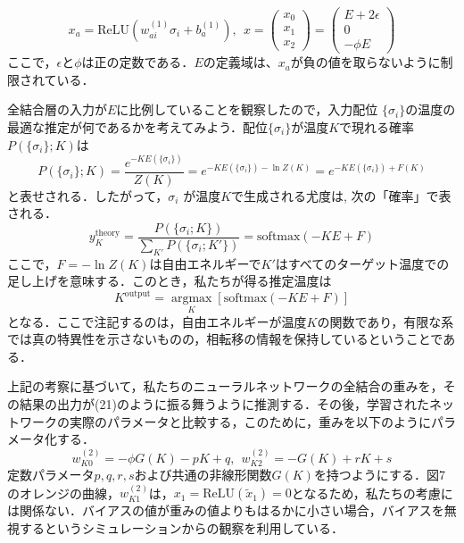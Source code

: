 \documentclass[a4paper,11pt]{jsreport}
\begin{document}
\begin{equation}
  x_a = \text{ReLU}(w_{ai}^{(1)}\sigma_i + b_a^{(1)}), \ \
  x = \begin{pmatrix} x_0 \\ x_1 \\ x_2 \end{pmatrix}
  = \begin{pmatrix} E+2\epsilon \\ 0 \\ -\phi E \end{pmatrix}
\end{equation}
ここで，$\epsilon$と$\phi$は正の定数である．$E$の定義域は、$x_a$が負の値を取らないように制限されている．\par
全結合層の入力が$E$に比例していることを観察したので，入力配位 $\{\sigma_i\}$の温度の最適な推定が何であるかを考えてみよう．配位$\{ \sigma_i \}$が温度$K$で現れる確率$P(\{ \sigma_i \} ; K )$は
\begin{equation}
  P(\{ \sigma_i \} ; K )
  = \frac{e^{-KE(\{ \sigma_i \})}}{Z(K)}
  = e^{-KE(\{ \sigma_i \}) - \ln{Z(K)}}
  = e^{-KE(\{ \sigma_i \}) + F(K)}
\end{equation}
と表せされる．したがって，${\sigma_i}$ が温度$K$で生成される尤度は,
次の「確率」で表される．
\begin{equation}
  y_K^{\text{theory}} = \frac{P(\{\sigma_i ; K \})}{\sum_{K'}P(\{\sigma_i ; K' \})} = \text{softmax}(-KE + F)
\end{equation}
ここで，$F = -\ln{Z(K)}$は自由エネルギーで$K'$はすべてのターゲット温度での足し上げを意味する．このとき，私たちが得る推定温度は
\begin{equation}
  K^{\text{output}} =
  \underset{K} {\operatorname{argmax}} \left[\text{softmax}(-KE + F)\right]
\end{equation}
となる．ここで注記するのは，自由エネルギーが温度$K$の関数であり，有限な系では真の特異性を示さないものの，相転移の情報を保持しているということである．\par
上記の考察に基づいて，私たちのニューラルネットワークの全結合の重みを，その結果の出力が(21)のように振る舞うように推測する．その後，学習されたネットワークの実際のパラメータと比較する，このために，重みを以下のようにパラメータ化する．
\begin{equation}
  w_{K0}^{(2)} = -\phi G(K) - pK + q, \ \
  w_{K2}^{(2)} = -G(K) + rK + s
\end{equation}
定数パラメータ$p,q,r,s$および共通の非線形関数$G(K)$を持つようにする．図7のオレンジの曲線，$w^{(2)}_{K1}$は，$x_1 = \text{ReLU}(\tilde{x}_1) = 0$となるため，私たちの考慮には関係ない．バイアスの値が重みの値よりもはるかに小さい場合，バイアスを無視するというシミュレーションからの観察を利用している．\par
\end{document}
